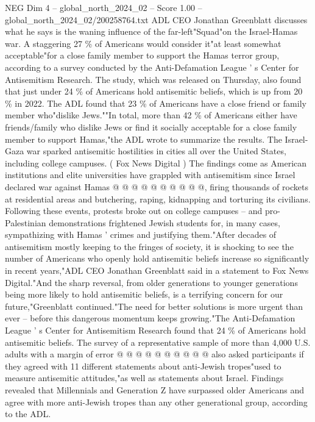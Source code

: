\begin{textsample}{NEG Dim 4 – global\_north\_2024\_02 – Score 1.00 – global\_north\_2024\_02/200258764.txt}  \label{ex:f4_neg_274}
ADL CEO Jonathan Greenblatt discusses what he says is the waning influence of the far-left"Squad"on the Israel-Hamas war.
A staggering 27 \% of Americans would consider it"at least somewhat acceptable"for a close family member to support the Hamas terror group, according to a survey conducted by the Anti-Defamation League ' s Center for Antisemitism Research.
The study, which was released on Thursday, also found that just under 24 \% of Americans hold antisemitic beliefs, which is up from 20 \% in 2022.
The ADL found that 23 \% of Americans have a close friend or family member who"dislike Jews.""In total, more than 42 \% of Americans either have friends/family who dislike Jews or find it socially acceptable for a close family member to support Hamas,"the ADL wrote to summarize the results.
The Israel-Gaza war sparked antisemitic hostilities in cities all over the United States, including college campuses. ( Fox News Digital ) The findings come as American institutions and elite universities have grappled with antisemitism since Israel declared war against Hamas @ @ @ @ @ @ @ @ @ @, firing thousands of rockets at residential areas and butchering, raping, kidnapping and torturing its civilians.
Following these events, protests broke out on college campuses -- and pro-Palestinian demonstrations frightened Jewish students for, in many cases, sympathizing with Hamas ' crimes and justifying them."After decades of antisemitism mostly keeping to the fringes of society, it is shocking to see the number of Americans who openly hold antisemitic beliefs increase so significantly in recent years,"ADL CEO Jonathan Greenblatt said in a statement to Fox News Digital."And the sharp reversal, from older generations to younger generations being more likely to hold antisemitic beliefs, is a terrifying concern for our future,"Greenblatt continued."The need for better solutions is more urgent than ever -- before this dangerous momentum keeps growing."The Anti-Defamation League ' s Center for Antisemitism Research found that 24 \% of Americans hold antisemitic beliefs.
The survey of a representative sample of more than 4,000 U.S. adults with a margin of error @ @ @ @ @ @ @ @ @ @ also asked participants if they agreed with 11 different statements about anti-Jewish tropes"used to measure antisemitic attitudes,"as well as statements about Israel.
Findings revealed that Millennials and Generation Z have surpassed older Americans and agree with more anti-Jewish tropes than any other generational group, according to the ADL.

\end{textsample}
